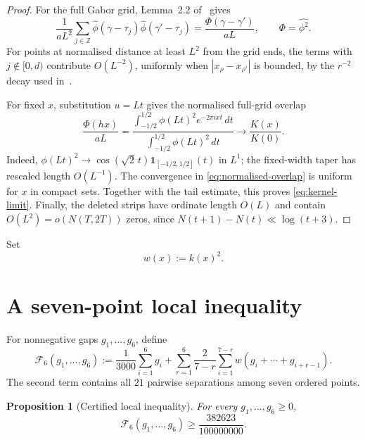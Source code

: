 \documentclass[11pt]{article}
\newtheorem{proposition}[theorem]{Proposition}
\begin{document}
\begin{proof}
For the full Gabor grid, Lemma~2.2 of~\cite{Claude26} gives
\[
 \frac1{aL^2}\sum_{j\in\mathbb Z}
 \widehat\phi(\gamma-\tau_j)\widehat\phi(\gamma'-\tau_j)
 =\frac{\Phi(\gamma-\gamma')}{aL},
 \qquad \Phi=\widehat{\phi^2}.
\]
For points at normalised distance at least $L^2$ from the grid ends, the
terms with $j\notin[0,d)$ contribute $O(L^{-2})$, uniformly when
$|x_\rho-x_{\rho'}|$ is bounded, by the $r^{-2}$ decay used
in~\cite[\S5.3]{Claude26}.

For fixed $x$, substitution $u=Lt$ gives the normalised full-grid overlap
\begin{equation}\label{eq:normalised-overlap}
 \frac{\Phi(hx)}{aL}
 =
 \frac{\displaystyle\int_{-1/2}^{1/2}
       \phi(Lt)^2 e^{-2\pi ixt}\,dt}
      {\displaystyle\int_{-1/2}^{1/2}\phi(Lt)^2\,dt}
 \longrightarrow \frac{K(x)}{K(0)}.
\end{equation}
Indeed,
$\phi(Lt)^2\to\cos(\sqrt2\,t)\mathbf1_{[-1/2,1/2]}(t)$ in $L^1$;
the fixed-width taper has rescaled length $O(L^{-1})$.  The convergence in
\eqref{eq:normalised-overlap} is uniform for $x$ in compact sets.  Together
with the tail estimate, this proves \eqref{eq:kernel-limit}.  Finally, the
deleted strips have ordinate length $O(L)$ and contain $O(L^2)=o(N(T,2T))$
zeros, since $N(t+1)-N(t)\ll\log(t+3)$.
\end{proof}

Set
\[
 w(x):=k(x)^2.
\]

\clearpage
\section{A seven-point local inequality}

For nonnegative gaps $g_1,\ldots,g_6$, define
\begin{equation}\label{eq:F6}
 \mathcal F_6(g_1,\ldots,g_6)
 :=\frac1{3000}\sum_{i=1}^6g_i
 +\sum_{r=1}^6\frac{2}{7-r}
   \sum_{i=1}^{7-r}w(g_i+\cdots+g_{i+r-1}).
\end{equation}
The second term contains all $21$ pairwise separations among seven ordered
points.

\begin{proposition}[Certified local inequality]\label{prop:F6}
For every $g_1,\ldots,g_6\ge0$,
\begin{equation}\label{eq:F6bound}
 \mathcal F_6(g_1,\ldots,g_6)\ge\frac{382623}{100000000}.
\end{equation}
\end{proposition}
\end{document}
